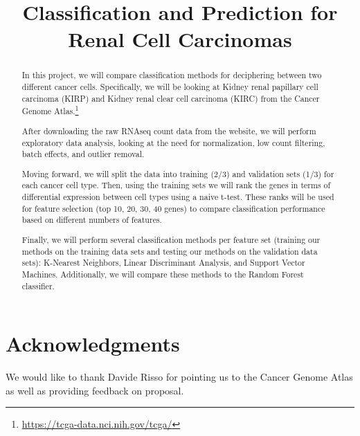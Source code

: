 



\begin{frontmatter}

\title{Classification and Prediction for Renal Cell Carcinomas}




\begin{abstract}

In this project, we will compare classification methods for deciphering between
two different cancer cells. Specifically, we will be looking at Kidney renal
papillary cell carcinoma (KIRP) and Kidney renal clear cell carcinoma (KIRC)
from the Cancer Genome
Atlas.\footnote{\url{https://tcga-data.nci.nih.gov/tcga/}}

After downloading the raw RNAseq count data from the website, we will perform
exploratory data analysis, looking at the need for normalization, low count
filtering, batch effects, and outlier removal.

Moving forward, we will split the data into training (2/3) and validation sets
(1/3) for each cancer cell type. Then, using the training sets we will rank the
genes in terms of differential expression between cell types using a naive
t-test. These ranks will be used for feature selection (top 10, 20, 30, 40
genes) to compare classification performance based on different numbers of
features.

Finally, we will perform several classification methods per feature set
(training our methods on the training data sets and testing our methods on the
validation data sets): K-Nearest Neighbors, Linear Discriminant Analysis, and
Support Vector Machines.  Additionally, we will compare these methods to the
Random Forest classifier.

 
\end{abstract}

\begin{keyword}
\end{keyword}

\end{frontmatter}

\section*{Acknowledgments}
We would like to thank Davide Risso for pointing us to the Cancer Genome
Atlas as well as providing feedback on proposal.


